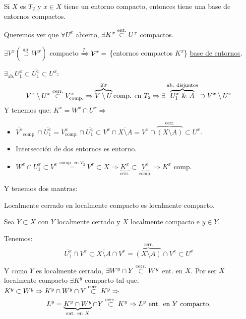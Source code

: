 \begin{prop}
Si $X$ es $T_2$ y $x \in X$ tiene un entorno compacto, entonces tiene una base de entornos compactos.
\end{prop}
\begin{demo}
    Queremos ver que $\forall U^x$ abierto, $\exists K^x \stackrel{\text{ent.}}{\subset} U^x$ compactos.

    $\exists V^x (\stackrel{\text{ab.}}{\supset} W^x)$ compacto $\xRightarrow{?} \mathcal{V}^x =$ \{entornos compactos $K^x$\} \underline{base de entornos}.

    $\exists_{\text{ab.}} U_1^x \subset \overline{U_1^x} \subset U^x$:
    \[ 
        V^x\setminus U^x \stackrel{\text{cerr.}}{\subset} V_{\text{comp.}}^x \Rightarrow \overbrace{V \setminus U}^{\not\ni x} \text{comp. en } T_2 \Rightarrow \exists \overbrace{U_1^x\ \&\ A}^{\text{ab. disjuntos}} \supset V^x \setminus U^x
    \]
    Y tenemos que: $K^x = \overline{W^x \cap U^x} \Rightarrow$
    \begin{itemize}
        \item $\overline{V^x}_{\text{comp.}} \cap \overline{U_1^x} = V^x_{\text{comp.}} \cap \overline{U_1^x} \subset V^x \cap \overline{X \setminus A} = V^x \cap \overbrace{\left( X \setminus A \right)}^{\text{cerr.}} \subset U^x$.
        \item Intersección de dos entornos es entorno.
        \item $W^x \cap U_1^x \subset V^x \stackrel{\text{comp. en } T_2}{=} \overline{V^x} \subset X \Rightarrow \underbrace{K^x}_{\text{cerr.}} \subset \underbrace{V^x}_{\text{comp.}} \Rightarrow K^x \text{ comp.}$
    \end{itemize}
\end{demo}

Y tenemos dos mantras:
\begin{prop}[Mantra 1]
Localmente cerrado en localmente compacto es localmente compacto. 
\end{prop}
\begin{demo}
    Sea $Y \subset X$ con $Y$ localmente cerrado y $X$ localmente compacto e $y \in Y$.

    Tenemos:
    \[
    \overline{U_1^x} \cap V^x \subset \overline{X \setminus A} \cap V^x = \overbrace{\left( X \setminus A \right)}^{\text{cerr.}} \cap V^x \subset U^x
    \]

    Y como $Y$ es localmente cerrado, $\exists W^y \cap Y \stackrel{\text{cerr.}}{\subset} W^y$ ent. en $X$. Por ser $X$ localmente compacto $\exists K^y$ compacto tal que, $K^y \subset W^y \Rightarrow K^y \cap W^y \cap Y \stackrel{\text{cerr.}}{\subset} K^y \Rightarrow$
    \[
    L^y = \underbrace{K^y \cap W^y}_{\text{ent. en } X} \cap Y \stackrel{\text{cerr.}}{\subset} K^y \Rightarrow L^y \text{ ent. en } Y \text{ compacto.}  
    \]
\end{demo}

